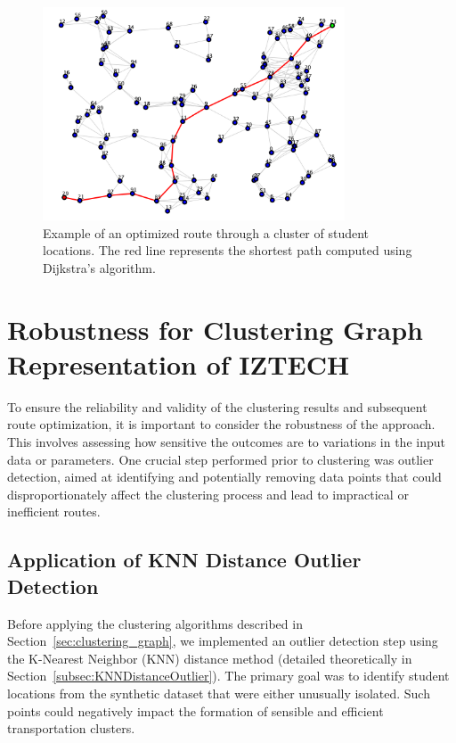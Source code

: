 \begin{figure}[!htbp]
\centering
\includegraphics[width=0.8\textwidth]{img/shortest_path}
\caption{Example of an optimized route through a cluster of student locations. The red line represents the shortest path computed using Dijkstra's algorithm.}
\label{fig:route_optimization}
\end{figure}

\section{Robustness for Clustering Graph Representation of IZTECH}
\label{sec:robustness}

To ensure the reliability and validity of the clustering results and subsequent route optimization, it is important to consider the robustness of the approach. This involves assessing how sensitive the outcomes are to variations in the input data or parameters. One crucial step performed prior to clustering was outlier detection, aimed at identifying and potentially removing data points that could disproportionately affect the clustering process and lead to impractical or inefficient routes.

\subsection{Application of KNN Distance Outlier Detection}
\label{subsec:knn_outlier_application}

Before applying the clustering algorithms described in Section~\ref{sec:clustering_graph}, we implemented an outlier detection step using the K-Nearest Neighbor (KNN) distance method (detailed theoretically in Section~\ref{subsec:KNNDistanceOutlier}). The primary goal was to identify student locations from the synthetic dataset that were either unusually isolated. Such points could negatively impact the formation of sensible and efficient transportation clusters.

